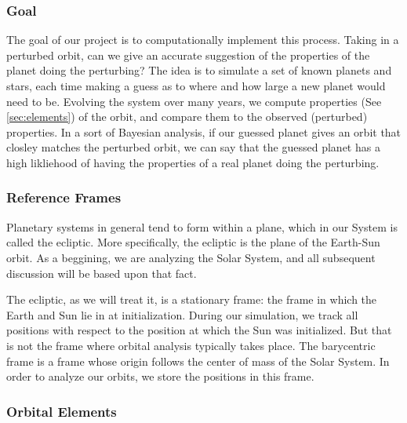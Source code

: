 \documentclass[a4paper,12pt]{article} %
\numberwithin{equation}{section} %
\numberwithin{figure}{section} %
\begin{document}
\subsubsection{Goal}

The goal of our project is to computationally implement this process. Taking in a perturbed orbit, can we give an accurate suggestion of the properties of the planet doing the perturbing? The idea is to simulate a set of known planets and stars, each time making a guess as to where and how large a new planet would need to be. Evolving the system over many years, we compute properties (See \autoref{sec:elements}) of the orbit, and compare them to the observed (perturbed) properties. In a sort of Bayesian analysis, if our guessed planet gives an orbit that closley matches the perturbed orbit, we can say that the guessed planet has a high likliehood of having the properties of a real planet doing the perturbing.

\subsubsection{Reference Frames}

Planetary systems in general tend to form within a plane, which in our System is called the ecliptic. More specifically, the ecliptic is the plane of the Earth-Sun orbit. As a beggining, we are analyzing the Solar System, and all subsequent discussion will be based upon that fact. \par
The ecliptic, as we will treat it, is a stationary frame: the frame in which the Earth and Sun lie in at initialization. During our simulation, we track all positions with respect to the position at which the Sun was initialized. But that is not the frame where orbital analysis typically takes place. The barycentric frame is a frame whose origin follows the center of mass of the Solar System. In order to analyze our orbits, we store the positions in this frame.

\subsubsection{Orbital Elements}
\label{sec:elements}
\end{document}
